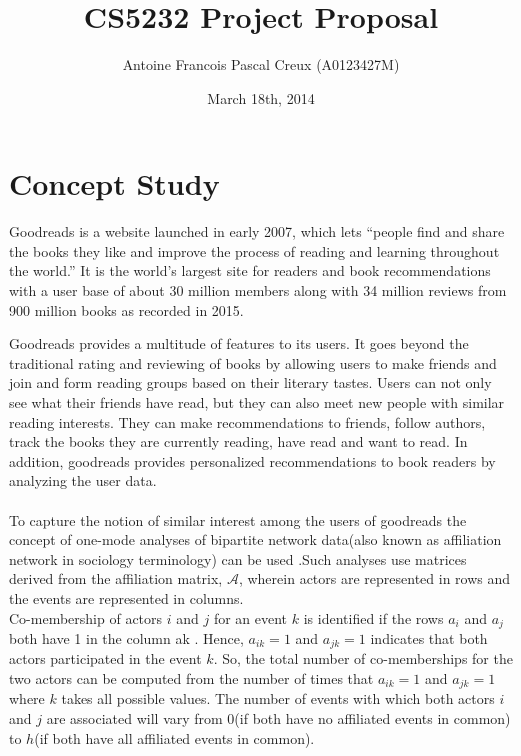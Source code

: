 \documentclass[11pt]{article}
\title{\textbf{CS5232 Project Proposal\\} }
\author{Antoine Francois Pascal Creux (A0123427M)}
\date{March 18th, 2014}
\begin{document}
\maketitle


\section{Concept Study}
Goodreads is a website launched in early 2007, which lets ``people find and share the books they like and improve the process of reading and learning throughout the world.'' It is the world’s largest site for readers and book recommendations with a user base of about  30 million members along with 34 million reviews from 900 million books as recorded in 2015\cite{goodreads:aboutus}.

Goodreads provides a multitude of features to its users. It goes beyond the traditional rating and reviewing of books by allowing users to make friends and join and form reading groups based on their literary tastes. Users can not only see what their friends have read, but they can also meet new people with similar reading interests. They can make recommendations to friends, follow authors, track the books they are currently reading, have read and want to read. In addition, goodreads provides personalized recommendations to book readers by analyzing the user data. \\\\

To capture the notion of similar interest among the users of goodreads  the concept of one-mode analyses of bipartite network data(also known as affiliation network in sociology terminology) can be used \cite{wasserman}.Such analyses use matrices derived from the affiliation matrix, $\mathcal{A}$, wherein actors are represented in rows and the events are represented in columns.\\
Co-membership of actors $i$ and $j$ for an event $k$ is identified if the rows $a_i$ and $a_j$ both have 1 in the column ak . Hence,  $a_{ik} = 1$ and $a_{jk} = 1$ indicates that both actors participated in the event $k$. So, the total number of co-memberships for the two actors can be computed from the number of times that $a_{ik} = 1$ and $a_{jk} = 1$ where $k$ takes all possible values. The number of events with which both actors $i$ and $j$ are associated will vary from  0(if both have no affiliated events in common) to $h$(if both have all affiliated events in common).\\\\
\end{document}
